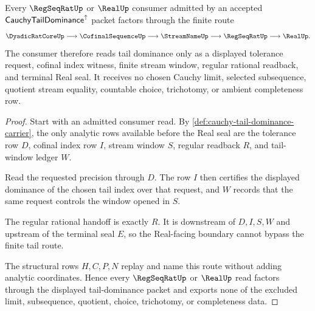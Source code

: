 \begin{theorem}
\label{thm:cauchy-tail-dominance-regseqrat-handoff}
Every $\RegSeqRatUp$ or $\RealUp$ consumer admitted by an accepted $\mathsf{CauchyTailDominance}^{\uparrow}$ packet factors through the finite route
$$
\DyadicRatCoreUp \longrightarrow \CofinalSequenceUp \longrightarrow \StreamNameUp \longrightarrow \RegSeqRatUp \longrightarrow \RealUp .
$$
The consumer therefore reads tail dominance only as a displayed tolerance request, cofinal index witness, finite stream window, regular rational readback, and terminal Real seal. It receives no chosen Cauchy limit, selected subsequence, quotient stream equality, countable choice, trichotomy, or ambient completeness row.
\end{theorem}
\begin{proof}
Start with an admitted consumer read. By \autoref{def:cauchy-tail-dominance-carrier}, the only analytic rows available before the Real seal are the tolerance row $D$, cofinal index row $I$, stream window $S$, regular readback $R$, and tail-window ledger $W$.

Read the requested precision through $D$. The row $I$ then certifies the displayed dominance of the chosen tail index over that request, and $W$ records that the same request controls the window opened in $S$.

The regular rational handoff is exactly $R$. It is downstream of $D,I,S,W$ and upstream of the terminal seal $E$, so the Real-facing boundary cannot bypass the finite tail route.

The structural rows $H,C,P,N$ replay and name this route without adding analytic coordinates. Hence every $\RegSeqRatUp$ or $\RealUp$ read factors through the displayed tail-dominance packet and exports none of the excluded limit, subsequence, quotient, choice, trichotomy, or completeness data.
\end{proof}

